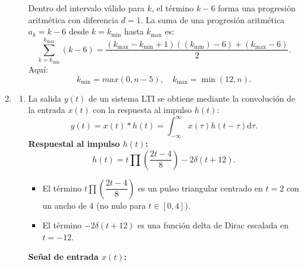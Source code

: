\begin{enumerate}[label=\color{red}\textbf{\arabic*)}]
\begin{enumerate}[label=\textbf{\arabic*)}]
        Dentro del intervalo válido para $k$, el término $k-6$ forma una progresión aritmética con diferencia $d=1$. La suma de una progresión aritmética  $a_k=k-6$ desde  $k=k_{\min}$ hasta $k_{\max}$ es: \[
        \sum_{k=k_{\min}}^{k_{\max}}(k-6)=\dfrac{(k_{\max}-k_{\min}+1)((k_{\min})-6)+(k_{\max}-6)}{2}. 
        \] 
        Aquí: \[
        k_{\min}=max(0,n-5),\quad k_{\max}=\min(12,n).
        \] 
\end{enumerate}
\item {} 
\begin{center}
\end{center}
\begin{enumerate}[label=\color{red}\textbf{\alph*)}]
    \item {} 

        La salida $y(t)$ de un sistema LTI se obtiene mediante la convolución de la entrada  $x(t)$ con la respuesta al impulso $h(t)$: \[
        y(t)=x(t)\ast h(t)=\int_{-\infty}^{\infty} x(\tau)h(t-\tau)\mathrm{d}\tau. 
        \] 
        \textbf{Respuestal al impulso $h(t)$:} \[
        h(t)=t\prod\left( \dfrac{2t-4}{8} \right) -2\delta(t+12).
        \]  
        \begin{itemize}[label=\textbullet]
            \item El término $t\prod\left( \dfrac{2t-4}{8} \right) $ es un pulso triangular centrado en $t=2$ con un ancho de 4 (no nulo para $t\in [0,4]$).
            \item El término $-2\delta(t+12)$ es una función delta de Dirac escalada en  $t=-12$.
        \end{itemize}   
        \textbf{Señal de entrada $x(t)$:}


\end{enumerate}
\end{enumerate}
